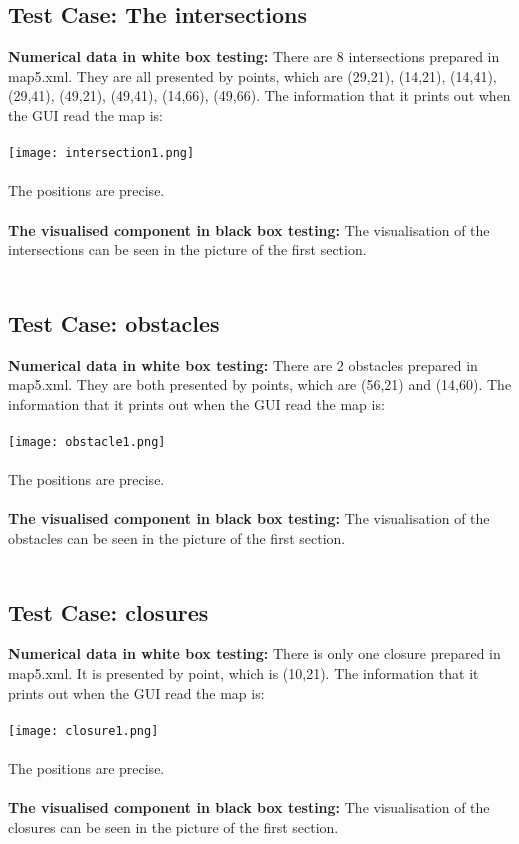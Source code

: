 \documentclass[11pt, a4paper]{article}
\begin{document}
\subsection{Test Case: The intersections}
\textbf{Numerical data in white box testing:} 
There are 8 intersections prepared in map5.xml. They are all presented by points, which are (29,21), (14,21), (14,41), (29,41), (49,21), (49,41), (14,66), (49,66). The information that it prints out when the GUI read the map is:\\
\\
\texttt{[image: intersection1.png]}\\
\\
The positions are precise. \\
\\
\textbf{The visualised component in black box testing:}
The visualisation of the intersections can be seen in the picture of the first section.\\
\\

\subsection{Test Case: obstacles}
\textbf{Numerical data in white box testing:} 
There are 2 obstacles prepared in map5.xml. They are both presented by points, which are (56,21) and (14,60). The information that it prints out when the GUI read the map is: \\
\\
\texttt{[image: obstacle1.png]}\\
\\
The positions are precise. \\
\\
\textbf{The visualised component in black box testing:}
The visualisation of the obstacles can be seen in the picture of the first section.\\
\\

\subsection{Test Case: closures}
\textbf{Numerical data in white box testing:} 
There is only one closure prepared in map5.xml. It is presented by point, which is (10,21). The information that it prints out when the GUI read the map is:\\
\\
\texttt{[image: closure1.png]}\\
\\
The positions are precise. \\
\\
\textbf{The visualised component in black box testing:}
The visualisation of the closures can be seen in the picture of the first section.\\
\\
\end{document}
